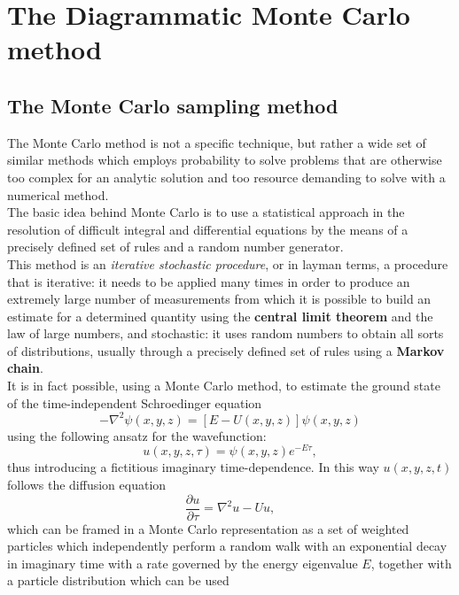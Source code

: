 \section{The Diagrammatic Monte Carlo method}
\subsection{The Monte Carlo sampling method}
The Monte Carlo method is not a specific technique, but rather a wide set of similar methods which employs probability to solve problems 
that are otherwise too complex for an analytic solution and too resource demanding to solve with a numerical method.\\
The basic idea behind Monte Carlo is to use a statistical approach in the resolution of difficult integral and differential equations 
\cite{metropolis1949monte} by the means of a precisely defined set of rules and a random number generator.\\
This method is an \textit{iterative stochastic procedure}, or in layman terms, a procedure that is iterative: it needs to be applied many times in 
order to produce an extremely large number of measurements from which it is possible to build an estimate for a determined quantity 
using the \textbf{central limit theorem} and the law of large numbers, and stochastic: it uses random numbers to obtain all sorts of distributions, 
usually through a precisely defined set of rules using a \textbf{Markov chain}.\\
It is in fact possible, using a Monte Carlo method, to estimate the ground state of the time-independent Schroedinger equation \cite{benedict2019quantum}
\begin{equation}
    -\nabla^2\psi(x,y,z)=\left[E-U(x,y,z)\right]\psi(x,y,z)
\end{equation}
using the following ansatz for the wavefunction:
\begin{equation}
    u(x,y,z,\tau)=\psi(x,y,z)e^{-E\tau},
\end{equation}
thus introducing a fictitious imaginary time-dependence. In this way $u(x,y,z,t)$ follows the diffusion equation
\begin{equation}
    \frac{\partial u}{\partial \tau}=\nabla^2u-Uu,
\end{equation}
which can be framed in a Monte Carlo representation as a set of weighted particles which independently perform a random walk with an 
exponential decay in imaginary time with a rate governed by the energy eigenvalue $E$, together with a particle distribution which can be used 
